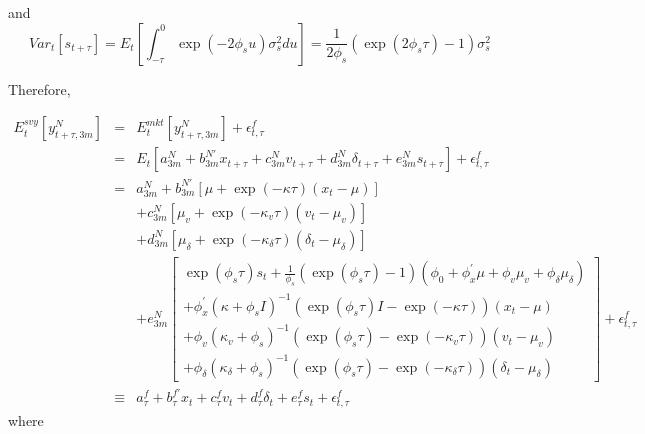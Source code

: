 \documentclass{article}
\begin{document}
and%
\begin{equation*}
Var_{t}\left[ s_{t+\tau }\right] =E_{t}\left[ \int_{-\tau }^{0}\exp \left(
-2\phi _{s}u\right) \sigma _{s}^{2}du\right] =\frac{1}{2\phi _{s}}\left(
\exp \left( 2\phi _{s}\tau \right) -1\right) \sigma _{s}^{2}
\end{equation*}

Therefore,

\begin{eqnarray*}
E_{t}^{svy}\left[ y_{t+\tau ,3m}^{N}\right] &=&E_{t}^{mkt}\left[ y_{t+\tau
,3m}^{N}\right] +\epsilon _{t,\tau }^{f} \\
&=&E_{t}\left[ a_{3m}^{N}+b_{3m}^{N\prime }x_{t+\tau }+c_{3m}^{N}v_{t+\tau
}+d_{3m}^{N}\delta _{t+\tau }+e_{3m}^{N}s_{t+\tau }\right] +\epsilon
_{t,\tau }^{f} \\
&=&a_{3m}^{N}+b_{3m}^{N\prime }\left[ \mu +\exp \left( -\kappa \tau \right)
\left( x_{t}-\mu \right) \right] \\
&&+c_{3m}^{N}\left[ \mu _{v}+\exp \left( -\kappa _{v}\tau \right) \left(
v_{t}-\mu _{v}\right) \right] \\
&&+d_{3m}^{N}\left[ \mu _{\delta }+\exp \left( -\kappa _{\delta }\tau
\right) \left( \delta _{t}-\mu _{\delta }\right) \right] \\
&&+e_{3m}^{N}\left[ 
\begin{array}{c}
\exp \left( \phi _{s}\tau \right) s_{t}+\frac{1}{\phi _{s}}\left( \exp
\left( \phi _{s}\tau \right) -1\right) \left( \phi _{0}+\phi _{x}^{\prime
}\mu +\phi _{v}\mu _{v}+\phi _{\delta }\mu _{\delta }\right) \\ 
+\phi _{x}^{\prime }\left( \kappa +\phi _{s}I\right) ^{-1}\left( \exp \left(
\phi _{s}\tau \right) I-\exp \left( -\kappa \tau \right) \right) \left(
x_{t}-\mu \right) \\ 
+\phi _{v}\left( \kappa _{v}+\phi _{s}\right) ^{-1}\left( \exp \left( \phi
_{s}\tau \right) -\exp \left( -\kappa _{v}\tau \right) \right) \left(
v_{t}-\mu _{v}\right) \\ 
+\phi _{\delta }\left( \kappa _{\delta }+\phi _{s}\right) ^{-1}\left( \exp
\left( \phi _{s}\tau \right) -\exp \left( -\kappa _{\delta }\tau \right)
\right) \left( \delta _{t}-\mu _{\delta }\right)%
\end{array}%
\right] +\epsilon _{t,\tau }^{f} \\
&\equiv &a_{\tau }^{f}+b_{\tau }^{f\prime }x_{t}+c_{\tau }^{f}v_{t}+d_{\tau
}^{f}\delta _{t}+e_{\tau }^{f}s_{t}+\epsilon _{t,\tau }^{f}
\end{eqnarray*}%
where%
\end{document}
